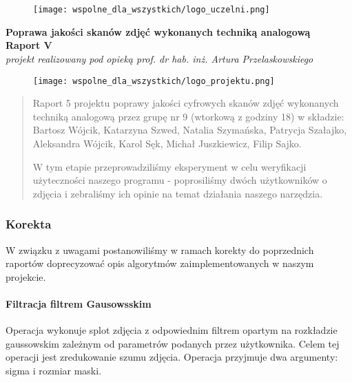 \documentclass[]{mwart}
\begin{document}
\newpage

\part{}
\thispagestyle{empty}

\begin{figure}[h]
    \centering
    \texttt{[image: wspolne\_dla\_wszystkich/logo\_uczelni.png]}
\end{figure}


\begin{center}
    {\LARGE \textbf{Poprawa jakości skanów zdjęć wykonanych techniką analogową
        }} \\[0.3cm]
    {\large \textbf{Raport V}} \\[0.2cm]
    \textit{projekt realizowany pod opieką prof. dr hab. inż. Artura Przelaskowskiego}

\end{center}

\begin{figure}[h]
    \centering
    \texttt{[image: wspolne\_dla\_wszystkich/logo\_projektu.png]}
\end{figure}

\vfill
\begin{abstract}
    Raport 5 projektu poprawy jakości cyfrowych skanów zdjęć wykonanych techniką analogową przez grupę nr 9 (wtorkową z godziny 18)
    w składzie:  Bartosz Wójcik, Katarzyna Szwed, Natalia Szymańska,
    Patrycja Szałajko, Aleksandra Wójcik, Karol Sęk, Michał Juszkiewicz, Filip Sajko.

    W tym etapie przeprowadziliśmy eksperyment w celu weryfikacji użyteczności naszego programu - poprosiliśmy dwóch użytkowników o zdjęcia i zebraliśmy ich opinie na temat działania naszego narzędzia.
\end{abstract}


\newpage


\section{Korekta}
W związku z uwagami postanowiliśmy w ramach korekty do poprzednich raportów doprecyzować opis algorytmów zaimplementowanych w naszym projekcie.


\subsection{Filtracja filtrem Gausowsskim}
Operacja wykonuje splot zdjęcia z odpowiednim filtrem opartym na rozkładzie gaussowskim
zależnym od parametrów podanych przez użytkownika. Celem tej operacji jest zredukowanie
szumu zdjęcia.
Operacja przyjmuje dwa argumenty: sigma i rozmiar maski. \newline
\end{document}
